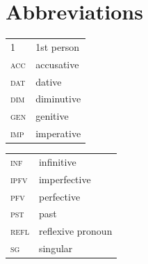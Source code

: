 \documentclass[output=paper,colorlinks,citecolor=brown]{langscibook}
\begin{document}
\section*{Abbreviations}

\begin{tabularx}{.5\textwidth}{@{}lX@{}}
\textsc{1}&1st person\\
\textsc{acc}&accusative\\
\textsc{dat}&dative\\
\textsc{dim}&diminutive\\
\textsc{gen}&genitive\\
\textsc{imp}&imperative\\
\end{tabularx}%
\begin{tabularx}{.5\textwidth}{@{}lX@{}}
\textsc{inf}&infinitive\\
\textsc{ipfv}&imperfective\\
\textsc{pfv}&perfective\\
\textsc{pst}&past\\
\textsc{refl}&reflexive pronoun\\
\textsc{sg}&singular\\
\end{tabularx}



\sloppy
\printbibliography[heading=subbibliography,notkeyword=this]
\end{document}
